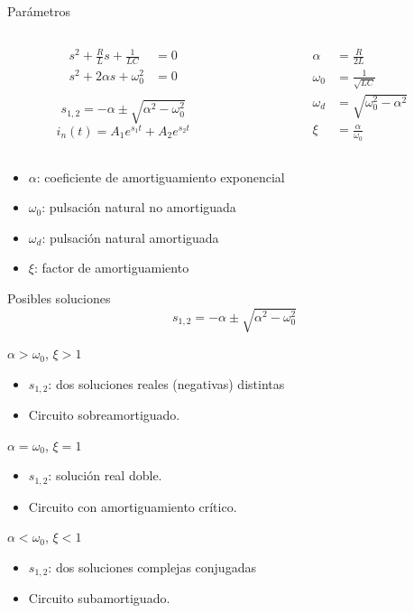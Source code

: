 \documentclass[aspectratio=169, usenames,svgnames,dvipsnames]{beamer}
\begin{document}
\begin{frame}[label={sec:org1cb98c5}]{Parámetros}
\begin{columns}
\begin{column}{.5\columnwidth}
\begin{align*}
  s^2 + \frac{R}{L} s + \frac{1}{LC} &= 0\\
  s^2 + 2\alpha s + \omega_0^2 &= 0  
\end{align*}

\[
  s_{1,2} = -\alpha \pm \sqrt{\alpha^2 - \omega_0^2}
\]
\[
  i_n(t) = A_1 e^{s_1 t} + A_2 e^{s_2 t}
\]
\end{column}
\begin{column}{.5\columnwidth}
\begin{align*}
  \alpha &= \frac{R}{2L}\\
  \omega_0 &= \frac{1}{\sqrt{LC}}\\
  \omega_d &= \sqrt{\omega_0^2 - \alpha^2}\\
  \xi &= \frac{\alpha}{\omega_0}
\end{align*}
\end{column}
\end{columns}
\vspace{1cm}
\begin{itemize}
\item \(\alpha\): coeficiente de amortiguamiento exponencial
\item \(\omega_0\): pulsación natural no amortiguada
\item \(\omega_d\): pulsación natural amortiguada
\item \(\xi\): factor de amortiguamiento
\end{itemize}
\end{frame}
\begin{frame}[label={sec:orga2ffa96}]{Posibles soluciones}
\[
  \boxed{s_{1,2} = -\alpha \pm \sqrt{\alpha^2 - \omega_0^2}}
\]
\begin{block}{\(\alpha > \omega_0\), \(\xi > 1\)}
\begin{itemize}
\item \(s_{1,2}\): dos soluciones reales (negativas) distintas
\item Circuito \alert{sobreamortiguado}.
\end{itemize}
\end{block}
\begin{block}{\(\alpha = \omega_0\), \(\xi = 1\)}
\begin{itemize}
\item \(s_{1,2}\): solución real doble.
\item Circuito con \alert{amortiguamiento crítico}.
\end{itemize}
\end{block}
\begin{block}{\(\alpha < \omega_0\), \(\xi < 1\)}
\begin{itemize}
\item \(s_{1,2}\): dos soluciones complejas conjugadas
\item Circuito \alert{subamortiguado}.
\end{itemize}
\end{block}
\end{frame}
\end{document}
